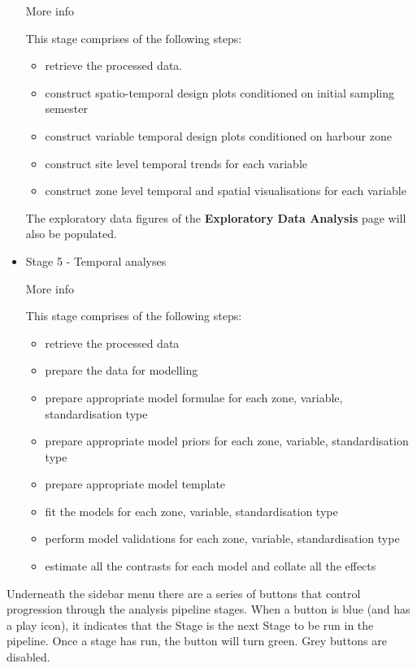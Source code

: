 \documentclass[
  8pt,
  a4paper]{article}
\providecommand{\tightlist}{%
  \setlength{\itemsep}{0pt}\setlength{\parskip}{0pt}}
\begin{document}
\begin{itemize}
  More info

  This stage comprises of the following steps:

  \begin{itemize}
  \tightlist
  \item
    retrieve the processed data.
  \item
    construct spatio-temporal design plots conditioned on initial
    sampling semester
  \item
    construct variable temporal design plots conditioned on harbour zone
  \item
    construct site level temporal trends for each variable
  \item
    construct zone level temporal and spatial visualisations for each
    variable
  \end{itemize}

  The exploratory data figures of the \textbf{Exploratory Data Analysis}
  page will also be populated.
\item
  Stage 5 - Temporal analyses

  More info

  This stage comprises of the following steps:

  \begin{itemize}
  \tightlist
  \item
    retrieve the processed data
  \item
    prepare the data for modelling
  \item
    prepare appropriate model formulae for each zone, variable,
    standardisation type
  \item
    prepare appropriate model priors for each zone, variable,
    standardisation type
  \item
    prepare appropriate model template
  \item
    fit the models for each zone, variable, standardisation type
  \item
    perform model validations for each zone, variable, standardisation
    type
  \item
    estimate all the contrasts for each model and collate all the
    effects
  \end{itemize}
\end{itemize}

Underneath the sidebar menu there are a series of buttons that control
progression through the analysis pipeline stages. When a button is blue
(and has a play icon), it indicates that the Stage is the next Stage to
be run in the pipeline. Once a stage has run, the button will turn
green. Grey buttons are disabled.
\end{document}
